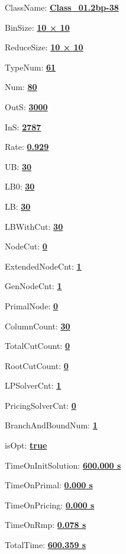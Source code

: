 \documentclass[11pt]{article}
\begin{document}
\pagestyle{empty}


ClassName: \underline{\textbf{Class_01.2bp-38}}
\par
BinSize: \underline{\textbf{10 × 10}}
\par
ReduceSize: \underline{\textbf{10 × 10}}
\par
TypeNum: \underline{\textbf{61}}
\par
Num: \underline{\textbf{80}}
\par
OutS: \underline{\textbf{3000}}
\par
InS: \underline{\textbf{2787}}
\par
Rate: \underline{\textbf{0.929}}
\par
UB: \underline{\textbf{30}}
\par
LB0: \underline{\textbf{30}}
\par
LB: \underline{\textbf{30}}
\par
LBWithCut: \underline{\textbf{30}}
\par
NodeCut: \underline{\textbf{0}}
\par
ExtendedNodeCnt: \underline{\textbf{1}}
\par
GenNodeCnt: \underline{\textbf{1}}
\par
PrimalNode: \underline{\textbf{0}}
\par
ColumnCount: \underline{\textbf{30}}
\par
TotalCutCount: \underline{\textbf{0}}
\par
RootCutCount: \underline{\textbf{0}}
\par
LPSolverCnt: \underline{\textbf{1}}
\par
PricingSolverCnt: \underline{\textbf{0}}
\par
BranchAndBoundNum: \underline{\textbf{1}}
\par
isOpt: \underline{\textbf{true}}
\par
TimeOnInitSolution: \underline{\textbf{600.000 s}}
\par
TimeOnPrimal: \underline{\textbf{0.000 s}}
\par
TimeOnPricing: \underline{\textbf{0.000 s}}
\par
TimeOnRmp: \underline{\textbf{0.078 s}}
\par
TotalTime: \underline{\textbf{600.359 s}}
\par
\newpage


\end{document}
